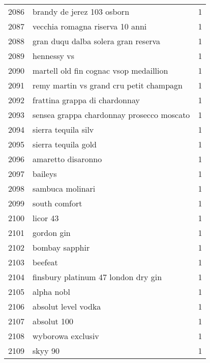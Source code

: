 \begin{tabular}{llr}
2086 &                         brandy de jerez 103 osborn &      1 \\
2087 &                    vecchia romagna riserva 10 anni &      1 \\
2088 &                gran duqu dalba solera gran reserva &      1 \\
2089 &                                        hennessy vs &      1 \\
2090 &             martell old fin cognac vsop medaillion &      1 \\
2091 &            remy martin vs grand cru petit champagn &      1 \\
2092 &                      frattina grappa di chardonnay &      1 \\
2093 &          sensea grappa chardonnay prosecco moscato &      1 \\
2094 &                                sierra tequila silv &      1 \\
2095 &                                sierra tequila gold &      1 \\
2096 &                                 amaretto disaronno &      1 \\
2097 &                                            baileys &      1 \\
2098 &                                   sambuca molinari &      1 \\
2099 &                                      south comfort &      1 \\
2100 &                                           licor 43 &      1 \\
2101 &                                         gordon gin &      1 \\
2102 &                                     bombay sapphir &      1 \\
2103 &                                            beefeat &      1 \\
2104 &                finsbury platinum 47 london dry gin &      1 \\
2105 &                                         alpha nobl &      1 \\
2106 &                                absolut level vodka &      1 \\
2107 &                                        absolut 100 &      1 \\
2108 &                                  wyborowa exclusiv &      1 \\
2109 &                                            skyy 90 &      1 \\

\end{tabular}
